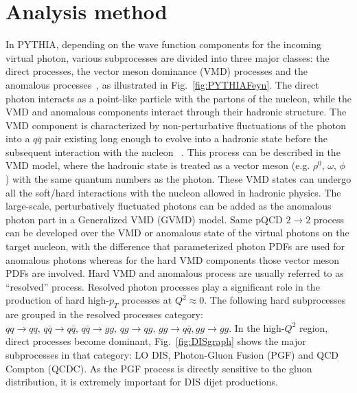 \section{Analysis method}

In PYTHIA, depending on the wave function components for the incoming virtual
photon, various subprocesses are divided into three major classes: the direct
processes, the vector meson dominance (VMD) processes and the anomalous processes~\cite{Friberg:2000ra},
as illustrated in Fig.~\ref{fig:PYTHIAFeyn}. The direct photon interacts as a
point-like particle with the partons of the nucleon, while the VMD and anomalous
components interact through their hadronic structure. The VMD component is
characterized by non-perturbative fluctuations of the photon into a $q\bar{q}$
pair existing long enough to evolve into a hadronic state before the subsequent
interaction with the nucleon ~\cite{Bauer:1977iq}. This process can be described
in the VMD model, where the hadronic state is treated as a vector meson (e.g.
$\rho^0$, $\omega$, $\phi$ ) with the same quantum numbers as the photon. These
VMD states can undergo all the soft/hard interactions with the nucleon allowed
in hadronic physics. The large-scale, perturbatively fluctuated photons can be
added as the anomalous photon part in a Generalized VMD (GVMD) model. Same pQCD
$2\rightarrow2$ process can be developed over the VMD or anomalous state of the
virtual photons on the target nucleon, with the difference that parameterized
photon PDFs are used for anomalous photons whereas for the hard VMD components
those vector meson PDFs are involved. Hard VMD and anomalous process are usually
referred to as ``resolved'' process. Resolved photon processes play a significant
role in the production of hard high-$p_{T}$ processes at $Q^{2}\approx0$. The
following hard subprocesses are grouped in the resolved processes category:
$qq\rightarrow qq, \, q\bar q \rightarrow q \bar q, \, q\bar q\rightarrow gg, \,
qg\rightarrow qg, \, gg\rightarrow q\bar q, gg\rightarrow gg$. In the
high-$Q^{2}$ region, direct processes become dominant, Fig.~\ref{fig:DISgraph}
shows the major subprocesses in that category: LO DIS, Photon-Gluon Fusion (PGF)
and QCD Compton (QCDC). As the PGF process is directly sensitive to the gluon
distribution, it is extremely important for DIS dijet productions. 


